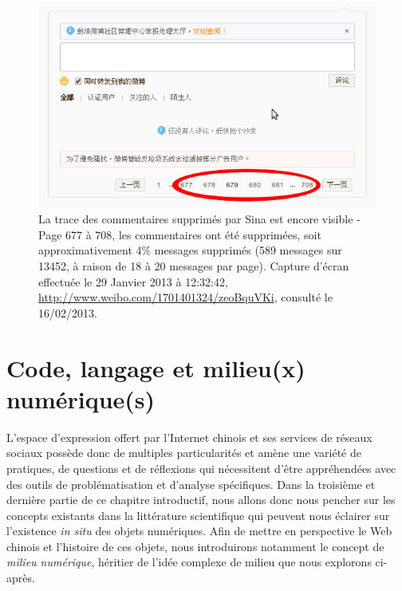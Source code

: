 \begin{figure}[htbp]
    \centering
    \includegraphics[scale=0.5]{figures/chap1/comments.png}
    \caption[Commentaires supprimés par Sina]{La trace des commentaires supprimés par Sina est encore visible - Page 677 à 708, les commentaires ont été supprimées, soit approximativement 4\% messages supprimés (589 messages sur 13452, à raison de 18 à 20 messages par page). Capture d’écran effectuée le 29 Janvier 2013 à 12:32:42, \url{http://www.weibo.com/1701401324/zeoBquVKi}, consulté le 16/02/2013.}
    \label{fig:comments}
\end{figure}


\section[Code, langage et milieu(x) numérique(s)]{ Code, langage et milieu(x) numérique(s)}
L’espace d’expression offert par l’Internet chinois et ses services de réseaux sociaux possède donc de multiples particularités et amène une variété de pratiques, de questions et de réflexions qui nécessitent d’être appréhendées avec des outils de problématisation et d’analyse spécifiques. Dans la troisième et dernière partie de ce chapitre introductif, nous allons donc nous pencher sur les concepts existants dans la littérature scientifique qui peuvent nous éclairer sur l’existence \textit{in situ} des objets numériques. Afin de mettre en perspective le Web chinois et l’histoire de ces objets, nous introduirons notamment le concept de \textit{milieu numérique}, héritier de l’idée complexe de milieu que nous explorons ci-après.

